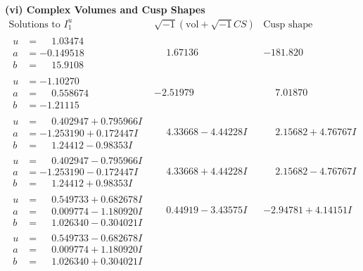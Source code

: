 \documentclass[1p]{elsarticle_modified}
\theoremstyle{definition}
\newcommand{\I}{\sqrt{-1}}
\begin{document}
\newpage\flushleft \textbf{(vi) Complex Volumes and Cusp Shapes}
$$\begin{array}{c|c|c}  
\text{Solutions to }I^u_{1}& \I (\text{vol} + \sqrt{-1}CS) & \text{Cusp shape}\\
 \hline 
\begin{aligned}
u &= \phantom{-}1.03474\phantom{ +0.000000I} \\
a &= -0.149518\phantom{ +0.000000I} \\
b &= \phantom{-}15.9108\phantom{ +0.000000I}\end{aligned}
 & \phantom{-}1.67136\phantom{ +0.000000I} & -181.820\phantom{ +0.000000I} \\ \hline\begin{aligned}
u &= -1.10270\phantom{ +0.000000I} \\
a &= \phantom{-}0.558674\phantom{ +0.000000I} \\
b &= -1.21115\phantom{ +0.000000I}\end{aligned}
 & -2.51979\phantom{ +0.000000I} & \phantom{-}7.01870\phantom{ +0.000000I} \\ \hline\begin{aligned}
u &= \phantom{-}0.402947 + 0.795966 I \\
a &= -1.253190 + 0.172447 I \\
b &= \phantom{-}1.24412 - 0.98353 I\end{aligned}
 & \phantom{-}4.33668 - 4.44228 I & \phantom{-}2.15682 + 4.76767 I \\ \hline\begin{aligned}
u &= \phantom{-}0.402947 - 0.795966 I \\
a &= -1.253190 - 0.172447 I \\
b &= \phantom{-}1.24412 + 0.98353 I\end{aligned}
 & \phantom{-}4.33668 + 4.44228 I & \phantom{-}2.15682 - 4.76767 I \\ \hline\begin{aligned}
u &= \phantom{-}0.549733 + 0.682678 I \\
a &= \phantom{-}0.009774 - 1.180920 I \\
b &= \phantom{-}1.026340 - 0.304021 I\end{aligned}
 & \phantom{-}0.44919 - 3.43575 I & -2.94781 + 4.14151 I \\ \hline\begin{aligned}
u &= \phantom{-}0.549733 - 0.682678 I \\
a &= \phantom{-}0.009774 + 1.180920 I \\
b &= \phantom{-}1.026340 + 0.304021 I\end{aligned}

\end{array}$$
\end{document}
